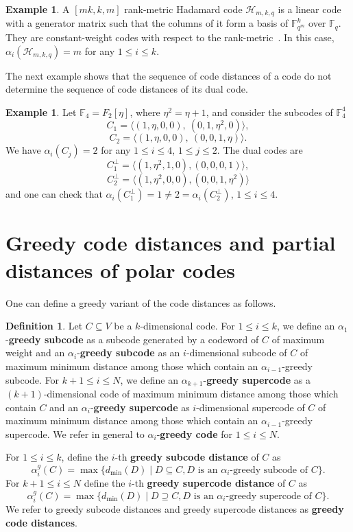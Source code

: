 \documentclass[12pt]{amsart}
\numberwithin{equation}{section}
\theoremstyle{definition}
\newtheorem{definition}[theorem]{Definition}
\newtheorem{example}[theorem]{Example}
\newcommand{\FF}{\mathbb{F}}
\begin{document}
\begin{example}\label{25.03.03}
A $[mk,k,m]$ rank-metric Hadamard code $\mathcal{H}_{m,k,q}$ is a linear code with a generator matrix such that the columns of it form a basis of $\mathbb{F}_{q^m}^k$ over $\mathbb{F}_q$. They are constant-weight codes with respect to the rank-metric~\cite[Corollary 2]{Ran20}. In this case, $\alpha_i(\mathcal{H}_{m,k,q})=m$ for any $1\leq i\leq k$. 
\end{example}

The next example shows that the sequence of code distances of a code do not determine the sequence of code distances of its dual code.

\begin{example}\rm
Let $\FF_4=F_2[\eta]$, where $\eta^2=\eta+1$, and consider the subcodes of $\mathbb{F}_4^4$
$$C_1=\langle (1,\eta,0,0),\ (0,1,\eta^2,0)\rangle,$$
$$C_2=\langle (1,\eta,0,0),\ (0,0,1,\eta)\rangle.$$
We have $\alpha_i(C_j)=2$ for any $1\leq i\leq 4$, $1\leq j\leq 2$. The dual codes are
    $$C_1^\perp=\langle (1,\eta^2,1,0), (0,0,0,1)\rangle,$$
    $$C_2^\perp=\langle (1,\eta^2,0,0),(0,0,1,\eta^2)\rangle$$
and one can check that $\alpha_i(C_1^\perp)=1\neq 2=\alpha_i(C_2^\perp)$, $1\leq i\leq 4$.
\end{example}


\section{Greedy code distances and partial distances of polar codes}\label{greedy}

One can define a greedy variant of the code distances as follows.

\begin{definition}
Let $C\subseteq V$ be a $k$-dimensional code. For $1\leq i\leq k$, we define an $\alpha_1$-{\bf greedy subcode} as a subcode generated by a codeword of $C$ of maximum weight and an $\alpha_i$-{\bf greedy subcode} as an $i$-dimensional subcode of $C$ of maximum minimum distance among those which contain an $\alpha_{i-1}$-greedy subcode. 
For $k+1\leq i\leq N$, we define an $\alpha_{k+1}$-{\bf greedy supercode} as a $(k+1)$-dimensional code of maximum minimum distance among those which contain $C$ and an $\alpha_i$-{\bf greedy supercode} as $i$-dimensional supercode of $C$ of maximum minimum distance among those which contain an $\alpha_{i-1}$-greedy supercode. We refer in general to $\alpha_i$-{\bf greedy code} for $1\leq i\leq N$.

For $1\leq i\leq k$, define the $i$-th {\bf greedy subcode distance} of $C$ as
$$\alpha^g_i(C)=\max\{d_{\min}(D)\mid D\subseteq C, D\mbox{ is an $\alpha_i$-greedy subcode of } C\}.$$
For $k+1\leq i\leq N$ define the $i$-th {\bf greedy supercode distance} of $C$ as
$$\alpha^g_i(C)=\max\{d_{\min}(D)\mid D\supseteq C, D\mbox{ is an $\alpha_i$-greedy supercode of } C\}.$$
We refer to greedy subcode distances and greedy supercode distances as {\bf greedy code distances}.
\end{definition}
\end{document}
